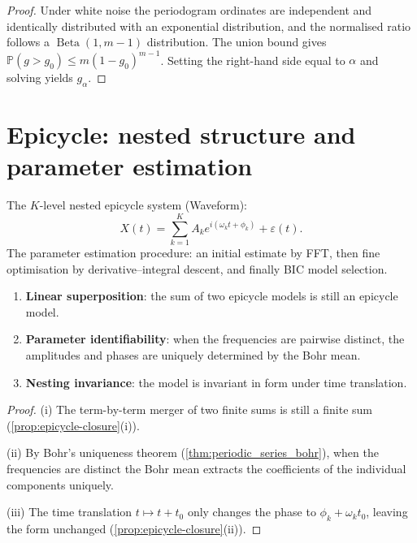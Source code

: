 \begin{proof}
Under white noise the periodogram ordinates are independent and identically distributed with an exponential distribution, and the normalised ratio follows a $\operatorname{Beta}(1, m-1)$ distribution. The union bound gives $\mathbb{P}(g > g_0) \le m(1-g_0)^{m-1}$. Setting the right-hand side equal to $\alpha$ and solving yields $g_\alpha$.
\end{proof}

\section{Epicycle: nested structure and parameter estimation}

\begin{definition}\label{def:epicycle_modelling}
The $K$-level nested epicycle system (Waveform):
\[
X(t) = \sum_{k=1}^{K} A_k e^{i(\omega_k t + \phi_k)} + \varepsilon(t).
\]
The parameter estimation procedure: an initial estimate by FFT, then fine optimisation by derivative--integral descent, and finally BIC model selection.
\end{definition}

\begin{property}\label{ch34_epicycle_properties}
\begin{enumerate}[label=(\roman*)]
    \item \textbf{Linear superposition}: the sum of two epicycle models is still an epicycle model.
    \item \textbf{Parameter identifiability}: when the frequencies are pairwise distinct, the amplitudes and phases are uniquely determined by the Bohr mean.
    \item \textbf{Nesting invariance}: the model is invariant in form under time translation.
\end{enumerate}
\end{property}

\begin{proof}
(i) The term-by-term merger of two finite sums is still a finite sum (\cref{prop:epicycle-closure}(i)).

(ii) By Bohr's uniqueness theorem (\cref{thm:periodic_series_bohr}), when the frequencies are distinct the Bohr mean extracts the coefficients of the individual components uniquely.

(iii) The time translation $t \mapsto t + t_0$ only changes the phase to $\phi_k + \omega_k t_0$, leaving the form unchanged (\cref{prop:epicycle-closure}(ii)).
\end{proof}

